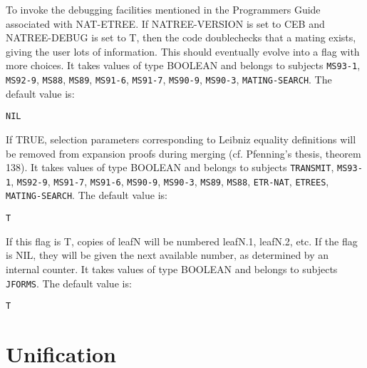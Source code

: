 \begin{description}
\item[NATREE-DEBUG]  
To invoke the debugging facilities mentioned in the Programmers
Guide associated with NAT-ETREE. If NATREE-VERSION is set to CEB and
NATREE-DEBUG is set to T, then the code doublechecks that a mating exists,
giving the user lots of information.  This should eventually evolve into
a flag with more choices.
It takes values of type BOOLEAN and belongs to subjects \texttt{MS93-1}, \texttt{MS92-9}, \texttt{MS88}, \texttt{MS89}, \texttt{MS91-6}, \texttt{MS91-7}, \texttt{MS90-9}, \texttt{MS90-3}, \texttt{MATING-SEARCH}.  The default value is: \begin{lstlisting}
NIL
\end{lstlisting}

\item[REMOVE-LEIBNIZ]  
If TRUE, selection parameters corresponding to Leibniz equality
definitions will be removed from expansion proofs during merging 
(cf. Pfenning's thesis, theorem 138).
It takes values of type BOOLEAN and belongs to subjects \texttt{TRANSMIT}, \texttt{MS93-1}, \texttt{MS92-9}, \texttt{MS91-7}, \texttt{MS91-6}, \texttt{MS90-9}, \texttt{MS90-3}, \texttt{MS89}, \texttt{MS88}, \texttt{ETR-NAT}, \texttt{ETREES}, \texttt{MATING-SEARCH}.  The default value is: \begin{lstlisting}
T
\end{lstlisting}

\item[RENUMBER-LEAVES]  
If this flag is T, copies of leafN will be numbered 
leafN.1, leafN.2, etc. If the flag is NIL, they will be given
the next available number, as determined by an internal counter.
It takes values of type BOOLEAN and belongs to subjects \texttt{JFORMS}.  The default value is: \begin{lstlisting}
T
\end{lstlisting}

\item
\end{description}

\section{Unification}

